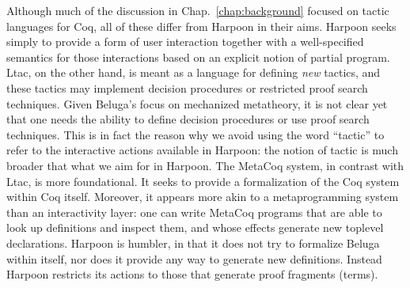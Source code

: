 Although much of the discussion in Chap.~\ref{chap:background} focused on tactic
languages for Coq, all of these differ from Harpoon in their aims.
Harpoon seeks simply to provide a form of user interaction together with a
well-specified semantics for those interactions based on an explicit notion of
partial program.
Ltac, on the other hand, is meant as a language for defining \emph{new} tactics,
and these tactics may implement decision procedures or restricted proof search
techniques.
Given Beluga's focus on mechanized metatheory, it is not clear yet that one
needs the ability to define decision procedures or use proof search techniques.
This is in fact the reason why we avoid using the word ``tactic'' to refer to
the interactive actions available in Harpoon: the notion of tactic is much
broader that what we aim for in Harpoon.
The MetaCoq system, in contrast with Ltac, is more foundational.
It seeks to provide a formalization of the Coq system within Coq itself.
Moreover, it appears more akin to a metaprogramming system than an interactivity
layer: one can write MetaCoq programs that are able to look up definitions and
inspect them, and whose effects generate new toplevel declarations.
Harpoon is humbler, in that it does not try to formalize Beluga within itself,
nor does it provide any way to generate new definitions.
Instead Harpoon restricts its actions to those that generate proof fragments
(terms).


